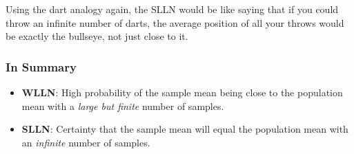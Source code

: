 \documentclass{article}
\begin{document}
Using the dart analogy again, the SLLN would be like saying that if you could throw an infinite number of darts, the average position of all your throws would be exactly the bullseye, not just close to it.

\subsubsection{In Summary}
\begin{itemize}
    \item \textbf{WLLN}: High probability of the sample mean being close to the population mean with a \textit{large but finite} number of samples.
    \item \textbf{SLLN}: Certainty that the sample mean will equal the population mean with an \textit{infinite} number of samples.
\end{itemize}
\end{document}
